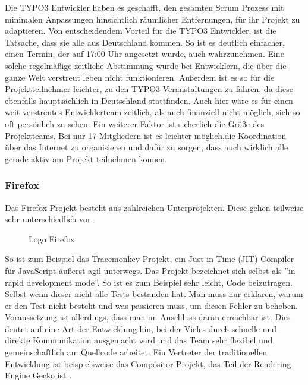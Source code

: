Die TYPO3 Entwickler haben es geschafft, den gesamten Scrum Prozess mit minimalen Anpassungen hinsichtlich räumlicher Entfernungen, für ihr Projekt zu adaptieren. Von entscheidendem Vorteil für die TYPO3 Entwickler, ist die Tatsache, dass sie alle aus Deutschland kommen. So ist es deutlich einfacher, einen Termin, der auf 17:00 Uhr angesetzt wurde, auch wahrzunehmen. Eine solche regelmäßige zeitliche Abstimmung würde bei Entwicklern, die über die ganze Welt verstreut leben nicht funktionieren. Außerdem ist es so für die Projektteilnehmer leichter, zu den TYPO3 Veranstaltungen zu fahren, da diese ebenfalls hauptsächlich in Deutschland stattfinden. Auch hier wäre es für einen weit verstreutes Entwicklerteam zeitlich, als auch  finanziell nicht möglich, sich so oft persönlich zu sehen. Ein weiterer Faktor ist sicherlich die Größe des Projektteams. Bei nur 17 Mitgliedern ist es leichter möglich,die Koordination über das Internet zu  organisieren und dafür zu sorgen, dass auch wirklich alle gerade aktiv am Projekt teilnehmen können.

\subsubsection{Firefox}
Das Firefox Projekt besteht aus zahlreichen Unterprojekten. Diese gehen teilweise sehr unterschiedlich vor.
\begin{figure}[h]
	\centering
	\caption{Logo Firefox\cite{bib:logo-firefox}}
	\label{fireLogo}
\end{figure}
So ist zum Beispiel das Tracemonkey Projekt, ein Just in Time (JIT) Compiler für JavaScript äußerst agil unterwegs. Das Projekt bezeichnet sich selbst als ''in rapid development mode''\cite{bib:trm}. So ist es zum Beispiel sehr leicht, Code beizutragen. Selbst wenn dieser nicht alle Tests bestanden hat. Man muss nur erklären, warum er den Test nicht besteht und was passieren muss, um diesen Fehler zu beheben\cite{bib:trm}. Voraussetzung ist allerdings, dass man im Anschluss daran erreichbar ist. Dies deutet auf eine Art der Entwicklung hin,  bei der Vieles durch schnelle und direkte Kommunikation ausgemacht wird und das Team sehr flexibel und gemeinschaftlich am Quellcode arbeitet.  Ein Vertreter der traditionellen Entwicklung ist beispielsweise das  Compositor Projekt, das  Teil der Rendering Engine Gecko ist \cite{bib:beltzner}.

